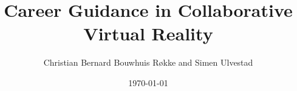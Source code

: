 \newcommand{\mytitle}{Career Guidance in Collaborative Virtual Reality}
\newcommand{\myauthor}{Christian Bernard Bouwhuis Røkke and Simen Ulvestad}

\title{\mytitle}
\author{\myauthor}
\date{\today}